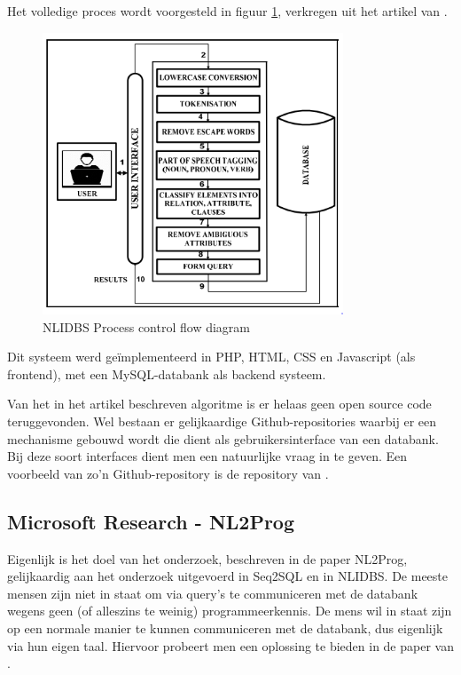 Het volledige proces wordt voorgesteld in figuur \ref{fig:nlidbs}, verkregen uit het artikel van \textcite{nlidbs}.

\begin{figure}[ht]
	\centering
	\includegraphics[width=0.80\textwidth]{img/nlidbs}
	\caption[NLIDBS proces]{NLIDBS Process control flow diagram}
	\label{fig:nlidbs}
\end{figure}

Dit systeem werd geïmplementeerd in PHP, HTML, CSS en Javascript (als frontend), met een MySQL-databank als backend systeem.

Van het in het artikel beschreven algoritme is er helaas geen open source code teruggevonden. Wel bestaan er gelijkaardige Github-repositories waarbij er een mechanisme gebouwd wordt die dient als gebruikersinterface van een databank. Bij deze soort interfaces dient men een natuurlijke vraag in te geven. Een voorbeeld van zo'n Github-repository is de repository van \textcite{nlidb}.

\subsection{Microsoft Research - NL2Prog}

Eigenlijk is het doel van het onderzoek, beschreven in de paper NL2Prog, gelijkaardig aan het onderzoek uitgevoerd in Seq2SQL en in NLIDBS. De meeste mensen zijn niet in staat om via query's te communiceren met de databank wegens geen (of alleszins te weinig) programmeerkennis. De mens wil in staat zijn op een normale manier te kunnen communiceren met de databank, dus eigenlijk via hun eigen taal. Hiervoor probeert men een oplossing te bieden in de paper van \textcite{nl2prog}.		

